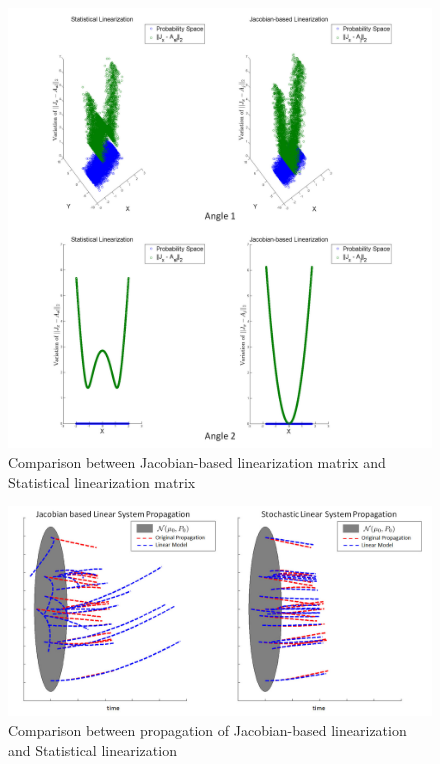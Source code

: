 \begin{figure}[H]
        \centering
        \includegraphics{figures/FIG_6}
        \caption{Comparison between Jacobian-based linearization matrix and Statistical linearization matrix}
        \label{compare2}
\end{figure}


\begin{figure}[H]
        \centering
        \includegraphics{figures/FIG_7}
        \caption{Comparison between propagation of Jacobian-based linearization and Statistical linearization}
        \label{compare}
\end{figure}

